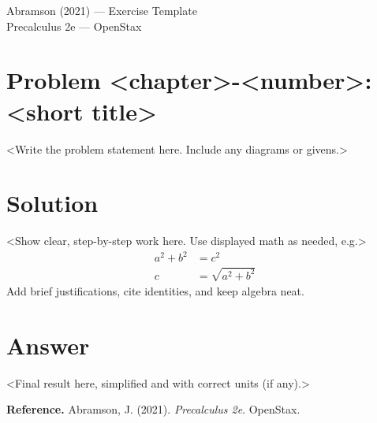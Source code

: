 \documentclass[12pt]{article}
\newenvironment{problem}[1]{\section*{Problem #1}}{}
\newenvironment{solution}{\section*{Solution}}{}
\newenvironment{answer}{\section*{Answer}}{}
\begin{document}
\begin{center}
    {\LARGE Abramson (2021) --- Exercise Template}\\[0.5em]
    {\large Precalculus 2e --- OpenStax}
\end{center}

\begin{problem}{<chapter>-<number>: <short title>}
<Write the problem statement here. Include any diagrams or givens.>
\end{problem}

\begin{solution}
<Show clear, step-by-step work here. Use displayed math as needed, e.g.>
\begin{align*}
    a^2 + b^2 &= c^2\\
    c &= \sqrt{a^2 + b^2}
\end{align*}
Add brief justifications, cite identities, and keep algebra neat.
\end{solution}

\begin{answer}
<Final result here, simplified and with correct units (if any).>
\end{answer}

\vfill
\textbf{Reference.} Abramson, J. (2021). \textit{Precalculus 2e}. OpenStax.
\end{document}
